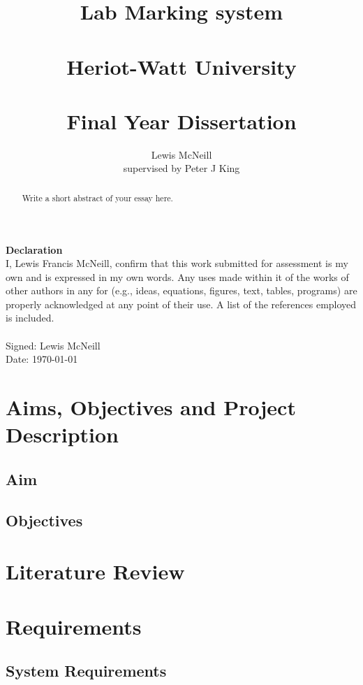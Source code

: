 \documentclass[12pt]{article}  %
\title{Lab Marking system \\~\\  \large{Heriot-Watt University} \\~\\ Final Year Dissertation}
\author{Lewis McNeill\\
supervised by
Peter J King}
\theoremstyle{definition}
\theoremstyle{remark}
\begin{document}
\maketitle

\newpage 

\textbf{\Large{Declaration}} \\[2em]
I, Lewis Francis McNeill, confirm that this work submitted for assessment is my own and is expressed in my own words. Any uses made within it of the works of other authors in any for (e.g., ideas, equations, figures, text, tables, programs) are properly acknowledged at any point of their use. A list of the references employed is included.
\\
\\
Signed: Lewis McNeill
\\
Date: \today

\newpage                     %
\begin{abstract}

Write a short abstract of your essay here.



\end{abstract}

\newpage                     %
\tableofcontents




\newpage                     %
\section{Aims, Objectives and Project Description}

\subsection{Aim}

\subsection{Objectives}

\newpage
\section{Literature Review}

\newpage
\section{Requirements}
\subsection{System Requirements}
\end{document}
